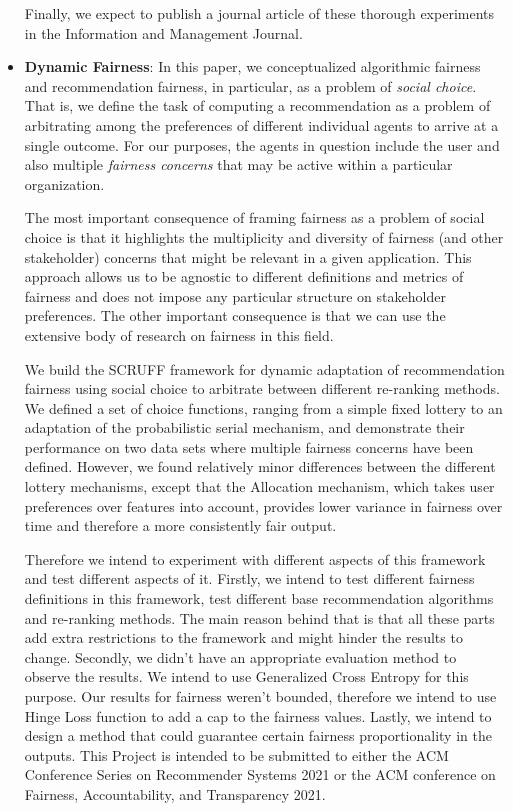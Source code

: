 \begin{itemize}
    Finally, we expect to publish a journal article of these thorough experiments in the Information and Management Journal.
    
    \item \textbf{Dynamic Fairness}: In this paper, we conceptualized algorithmic fairness and recommendation fairness, in particular, as a problem of \textit{social choice}. That is, we define the task of computing a recommendation as a problem of arbitrating among the preferences of different individual agents to arrive at a single outcome. For our purposes, the agents in question include the user and also multiple \textit{fairness concerns} that may be active within a particular organization.
    
    The most important consequence of framing fairness as a problem of social choice is that it highlights the multiplicity and diversity of fairness (and other stakeholder) concerns that might be relevant in a given application. This approach allows us to be agnostic to different definitions and metrics of fairness and does not impose any particular structure on stakeholder preferences. The other important consequence is that we can use the extensive body of research on fairness in this field.
    
    We build the SCRUFF framework for dynamic adaptation of recommendation fairness using social choice to arbitrate between different re-ranking methods. We defined a set of choice functions, ranging from a simple fixed lottery to an adaptation of the probabilistic serial mechanism, and demonstrate their performance on two data sets where multiple fairness concerns have been defined. However, we found relatively minor differences between the different lottery mechanisms, except that the Allocation mechanism, which takes user preferences over features into account, provides lower variance in fairness over time and therefore a more consistently fair output.
    
    Therefore we intend to experiment with different aspects of this framework and test different aspects of it. Firstly, we intend to test different fairness definitions in this framework, test different base recommendation algorithms and re-ranking methods. The main reason behind that is that all these parts add extra restrictions to the framework and might hinder the results to change. Secondly, we didn't have an appropriate evaluation method to observe the results. We intend to use Generalized Cross Entropy for this purpose. Our results for fairness weren't bounded, therefore we intend to use Hinge Loss function to add a cap to the fairness values. Lastly, we intend to design a method that could guarantee certain fairness proportionality in the outputs.
    This Project is intended to be submitted to either the ACM Conference Series on Recommender Systems 2021 or the ACM conference on Fairness, Accountability, and Transparency 2021.
    
    
\end{itemize}



